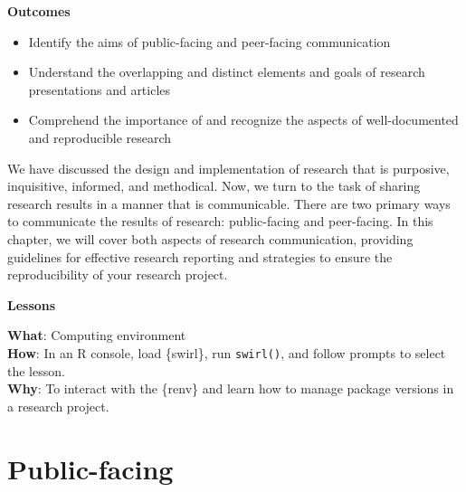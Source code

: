 \documentclass[
  letterpaper,
]{latex/krantz}
\providecommand{\tightlist}{%
  \setlength{\itemsep}{0pt}\setlength{\parskip}{0pt}}\usepackage{longtable,booktabs,array}
\theoremstyle{definition}
\theoremstyle{remark}
\begin{document}
\begin{tcolorbox}[enhanced jigsaw, colback=white, opacityback=0, bottomrule=.15mm, rightrule=.15mm, breakable, left=2mm, arc=.35mm, colframe=quarto-callout-color-frame, leftrule=.75mm, toprule=.15mm]

\textbf{ Outcomes}

\begin{itemize}
\tightlist
\item
  Identify the aims of public-facing and peer-facing communication
\item
  Understand the overlapping and distinct elements and goals of research
  presentations and articles
\item
  Comprehend the importance of and recognize the aspects of
  well-documented and reproducible research
\end{itemize}

\end{tcolorbox}

We have discussed the design and implementation of research that is
purposive, inquisitive, informed, and methodical. Now, we turn to the
task of sharing research results in a manner that is communicable. There
are two primary ways to communicate the results of research:
public-facing and peer-facing. In this chapter, we will cover both
aspects of research communication, providing guidelines for effective
research reporting and strategies to ensure the reproducibility of your
research project.

\begin{tcolorbox}[enhanced jigsaw, colback=white, opacityback=0, bottomrule=.15mm, rightrule=.15mm, breakable, left=2mm, arc=.35mm, colframe=quarto-callout-color-frame, leftrule=.75mm, toprule=.15mm]

\textbf{ Lessons}

\textbf{What}: Computing environment\\
\textbf{How}: In an R console, load \{swirl\}, run \texttt{swirl()}, and
follow prompts to select the lesson.\\
\textbf{Why}: To interact with the \{renv\} and learn how to manage
package versions in a research project.

\end{tcolorbox}

\section{Public-facing}\label{sec-contribute-public-facing}
\end{document}
